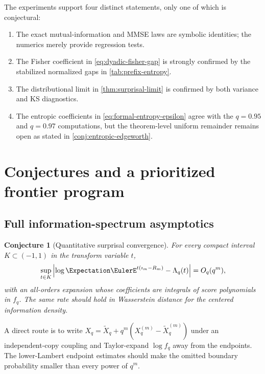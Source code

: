 \documentclass[11pt,oneside]{article}
\newtheorem{conjecture}[theorem]{Conjecture}
\theoremstyle{definition}
\theoremstyle{remark}
\begin{document}
The experiments support four distinct statements, only one of which is
conjectural:
\begin{enumerate}
\item The exact mutual-information and MMSE laws are symbolic identities; the
      numerics merely provide regression tests.
\item The Fisher coefficient in \eqref{eq:dyadic-fisher-gap} is strongly confirmed
      by the stabilized normalized gaps in \cref{tab:prefix-entropy}.
\item The distributional limit in \cref{thm:surprisal-limit} is confirmed by both
      variance and KS diagnostics.
\item The entropic coefficients in \eqref{eq:formal-entropy-epsilon} agree with
      the $q=0.95$ and $q=0.97$ computations, but the theorem-level uniform
      remainder remains open as stated in \cref{conj:entropic-edgeworth}.
\end{enumerate}

\section{Conjectures and a prioritized frontier program}
\label{sec:frontiers}

\subsection{Full information-spectrum asymptotics}

\begin{conjecture}[Quantitative surprisal convergence]
\label{conj:quantitative-spectrum}
For every compact interval $K\subset(-1,1)$ in the transform variable $t$,
\begin{equation}
 \sup_{t\in K}
 \left|\log\Expectation\EulerE^{t(\imath_m-R_m)}-\Lambda_q(t)\right|
 =O_q(q^m),
 \label{eq:quantitative-spectrum}
\end{equation}
with an all-orders expansion whose coefficients are integrals of score
polynomials in $f_q$.  The same rate should hold in Wasserstein distance for the
centered information density.
\end{conjecture}

A direct route is to write $X_q=\widetilde X_q+q^m(X_q^{(m)}-\widetilde
X_q^{(m)})$ under an independent-copy coupling and Taylor-expand $\log f_q$ away
from the endpoints.  The lower-Lambert endpoint estimates should make the omitted
boundary probability smaller than every power of $q^m$.
\end{document}
